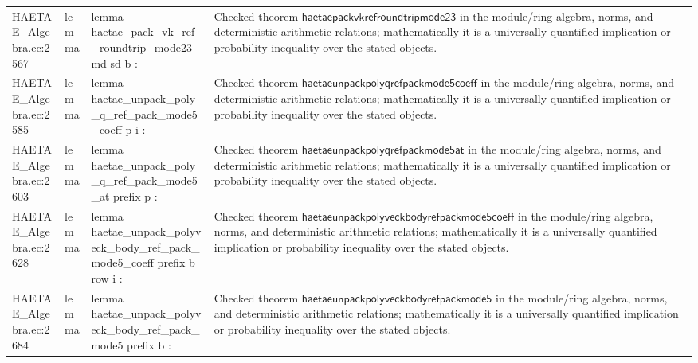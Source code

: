 \documentclass[10pt]{article}
\begin{document}
\begin{longtable}{L{0.11\textwidth}L{0.055\textwidth}L{0.385\textwidth}L{0.41\textwidth}}
HAETAE\_\allowbreak{}Algebra.\allowbreak{}ec:\allowbreak{}2567 & lemma & {\ttfamily\scriptsize lemma haetae\_\allowbreak{}pack\_\allowbreak{}vk\_\allowbreak{}ref\_\allowbreak{}roundtrip\_\allowbreak{}mode23 md sd b :} & Checked theorem $\mathsf{haetaepackvkrefroundtripmode23}$ in the module/ring algebra, norms, and deterministic arithmetic relations; mathematically it is a universally quantified implication or probability inequality over the stated objects. \\
HAETAE\_\allowbreak{}Algebra.\allowbreak{}ec:\allowbreak{}2585 & lemma & {\ttfamily\scriptsize lemma haetae\_\allowbreak{}unpack\_\allowbreak{}poly\_\allowbreak{}q\_\allowbreak{}ref\_\allowbreak{}pack\_\allowbreak{}mode5\_\allowbreak{}coeff p i :} & Checked theorem $\mathsf{haetaeunpackpolyqrefpackmode5coeff}$ in the module/ring algebra, norms, and deterministic arithmetic relations; mathematically it is a universally quantified implication or probability inequality over the stated objects. \\
HAETAE\_\allowbreak{}Algebra.\allowbreak{}ec:\allowbreak{}2603 & lemma & {\ttfamily\scriptsize lemma haetae\_\allowbreak{}unpack\_\allowbreak{}poly\_\allowbreak{}q\_\allowbreak{}ref\_\allowbreak{}pack\_\allowbreak{}mode5\_\allowbreak{}at prefix p :} & Checked theorem $\mathsf{haetaeunpackpolyqrefpackmode5at}$ in the module/ring algebra, norms, and deterministic arithmetic relations; mathematically it is a universally quantified implication or probability inequality over the stated objects. \\
HAETAE\_\allowbreak{}Algebra.\allowbreak{}ec:\allowbreak{}2628 & lemma & {\ttfamily\scriptsize lemma haetae\_\allowbreak{}unpack\_\allowbreak{}polyveck\_\allowbreak{}body\_\allowbreak{}ref\_\allowbreak{}pack\_\allowbreak{}mode5\_\allowbreak{}coeff prefix b row i :} & Checked theorem $\mathsf{haetaeunpackpolyveckbodyrefpackmode5coeff}$ in the module/ring algebra, norms, and deterministic arithmetic relations; mathematically it is a universally quantified implication or probability inequality over the stated objects. \\
HAETAE\_\allowbreak{}Algebra.\allowbreak{}ec:\allowbreak{}2684 & lemma & {\ttfamily\scriptsize lemma haetae\_\allowbreak{}unpack\_\allowbreak{}polyveck\_\allowbreak{}body\_\allowbreak{}ref\_\allowbreak{}pack\_\allowbreak{}mode5 prefix b :} & Checked theorem $\mathsf{haetaeunpackpolyveckbodyrefpackmode5}$ in the module/ring algebra, norms, and deterministic arithmetic relations; mathematically it is a universally quantified implication or probability inequality over the stated objects. \\

\end{longtable}
\end{document}
